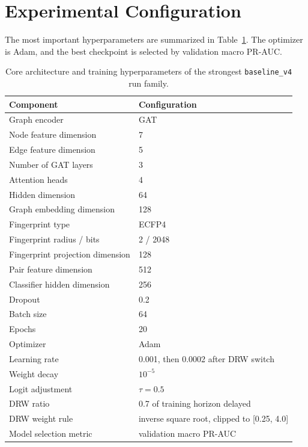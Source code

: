 \documentclass[12pt,a4paper]{report}
\begin{document}
\section{Experimental Configuration}
The most important hyperparameters are summarized in Table~\ref{tab:hyperparams}. The optimizer is Adam, and the best checkpoint is selected by validation macro PR-AUC.

\begin{table}[H]
\centering
\caption{Core architecture and training hyperparameters of the strongest \texttt{baseline\_v4} run family.}
\label{tab:hyperparams}
\begin{tabular}{ll}
\toprule
Component & Configuration \\
\midrule
Graph encoder & GAT \\
Node feature dimension & 7 \\
Edge feature dimension & 5 \\
Number of GAT layers & 3 \\
Attention heads & 4 \\
Hidden dimension & 64 \\
Graph embedding dimension & 128 \\
Fingerprint type & ECFP4 \\
Fingerprint radius / bits & 2 / 2048 \\
Fingerprint projection dimension & 128 \\
Pair feature dimension & 512 \\
Classifier hidden dimension & 256 \\
Dropout & 0.2 \\
Batch size & 64 \\
Epochs & 20 \\
Optimizer & Adam \\
Learning rate & 0.001, then 0.0002 after DRW switch \\
Weight decay & \(10^{-5}\) \\
Logit adjustment & \(\tau = 0.5\) \\
DRW ratio & 0.7 of training horizon delayed \\
DRW weight rule & inverse square root, clipped to [0.25, 4.0] \\
Model selection metric & validation macro PR-AUC \\
\bottomrule
\end{tabular}
\end{table}
\end{document}
